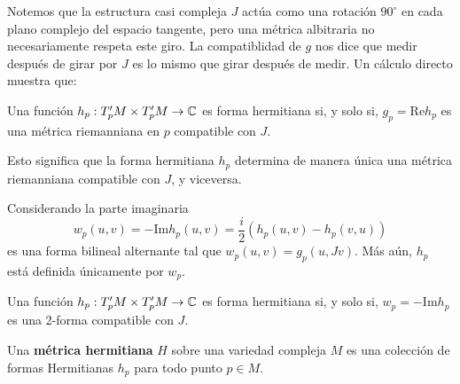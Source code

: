 Notemos que la estructura casi compleja $J$ actúa como una rotación $90^\circ$ en cada plano complejo del espacio tangente, pero una métrica albitraria no necesariamente respeta este giro. La compatiblidad de $g$ nos dice que medir después de girar por $J$ es lo mismo que girar después de medir. Un cálculo directo muestra que:
\begin{propo}
	Una función $h_p:T^\prime_pM\times T^\prime_pM\to\mathbb{C}$ es forma hermitiana si, y solo si, $g_p=\mathrm{Re}h_p$ es una métrica riemanniana en $p$ compatible con $J$.
\end{propo}

Esto significa que la forma hermitiana $h_p$ determina de manera única una métrica riemanniana compatible con $J$, y viceversa. 

Considerando la parte imaginaria
\begin{equation*}
	w_p(u,v)=-\mathrm{Im}h_p(u,v)=\frac{i}{2}(h_p(u,v)-h_p(v,u))
\end{equation*}
es una forma bilineal alternante tal que $w_p(u,v)=g_p(u,Jv)$. Más aún, $h_p$ está definida únicamente por $w_p$.

\begin{propo}
	Una función $h_p:T^\prime_pM\times T^\prime_pM\to\mathbb{C}$ es forma hermitiana si, y solo si, $w_p=-\mathrm{Im}h_p$ es una 2-forma compatible con $J$.	
\end{propo}

\begin{definition} 
	Una \textbf{métrica hermitiana} $H$ sobre una variedad compleja $M$ es una colección de formas Hermitianas $h_p$ para todo punto $p\in M$.
\end{definition}

